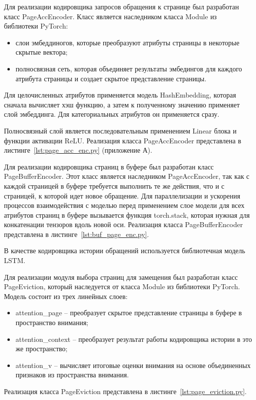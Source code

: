 Для реализации кодировщика запросов обращения к странице был разработан класс PageAccEncoder.
Класс является наследником класса Module из библиотеки PyTorch:
\begin{itemize}
	\item слои эмбеддиногов, которые преобразуют атрибуты страницы в некоторые скрытые вектора;
	\item полносвязная сеть, которая объединяет результаты эмбедингов для каждого атрибута страницы и создает скрытое представление страницы.
\end{itemize}

Для целочисленных атрибутов применяется модель HashEmbedding, которая сначала вычисляет хэш функцию, а затем к полученному значению применяет слой эмбеддинга.
Для категориальных атрибутов он применяется сразу.

Полносвязный слой является последовательным применением Linear блока и функции активации ReLU.
Реализация класса PageAccEncoder представлена в листинге~\ref{lst:page_acc_enc.py} (приложение А).

Для реализации кодировщика страниц в буфере был разработан класс PageBufferEncoder.
Этот класс является наследником PageAccEncoder, так как с каждой страницей в буфере требуется выполнить те же действия, что и с страницей, к которой идет новое обращение.
Для параллелизации и ускорения процессов взаимодействия с моделью перед применением слое модели для всех атрибутов страниц в буфере вызывается функция torch.stack, которая нужная для конкатенации тензоров вдоль новой оси.
Реализация класса PageBufferEncoder представлена в листинге~\ref{lst:buf_page_enc.py}.

В качестве кодировщика истории обращений используется библиотечная модель LSTM.

Для реализации модуля выбора страниц для замещения был разработан класс PageEviction, который наследуется от класса Module из библиотеки PyTorch.
Модель состоит из трех линейных слоев:
\begin{itemize}
	\item attention\_page -- преобразует скрытое представление страницы в буфере в пространство внимания;
	\item attention\_context -- преобразует результат работы кодировщика истории в это же пространство;
	\item attention\_v -- вычисляет итоговые оценки внимания на основе объединенных признаков из пространства внимания.
\end{itemize}
Реализация класса PageEviction представлена в листинге~\ref{lst:page_eviction.py}.

